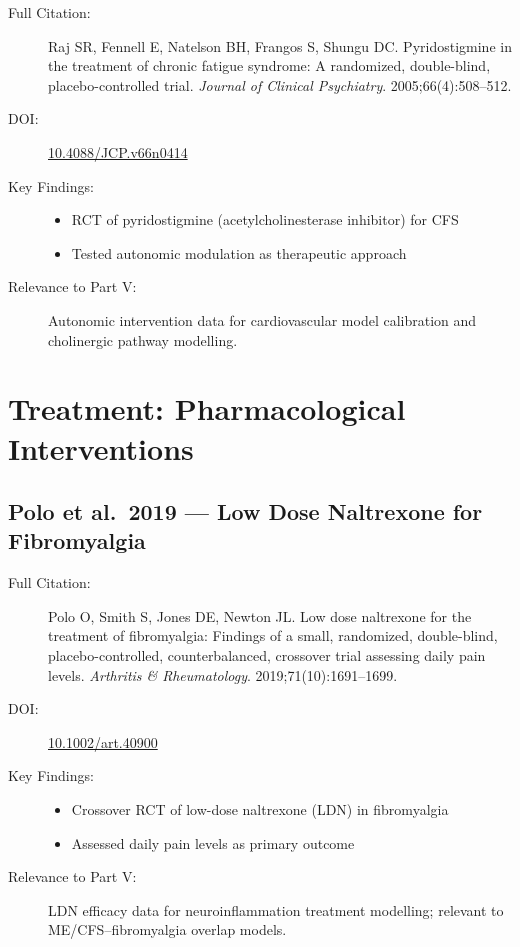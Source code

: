 \begin{description}
    \item[Full Citation:] Raj SR, Fennell E, Natelson BH, Frangos S, Shungu DC. Pyridostigmine in the treatment of chronic fatigue syndrome: A randomized, double-blind, placebo-controlled trial. \textit{Journal of Clinical Psychiatry}. 2005;66(4):508--512. \cite{Raj2005Pyridostigmine}
    \item[DOI:] \href{https://doi.org/10.4088/JCP.v66n0414}{10.4088/JCP.v66n0414}
    \item[Key Findings:]
    \begin{itemize}
        \item RCT of pyridostigmine (acetylcholinesterase inhibitor) for CFS
        \item Tested autonomic modulation as therapeutic approach
    \end{itemize}
    \item[Relevance to Part V:] Autonomic intervention data for cardiovascular model calibration and cholinergic pathway modelling.
\end{description}

\section{Treatment: Pharmacological Interventions}
\label{sec:bib-treatment-pharma-additions}

\subsection{Polo et al.\ 2019 --- Low Dose Naltrexone for Fibromyalgia}

\begin{description}
    \item[Full Citation:] Polo O, Smith S, Jones DE, Newton JL. Low dose naltrexone for the treatment of fibromyalgia: Findings of a small, randomized, double-blind, placebo-controlled, counterbalanced, crossover trial assessing daily pain levels. \textit{Arthritis \& Rheumatology}. 2019;71(10):1691--1699. \cite{Polo2019LDN}
    \item[DOI:] \href{https://doi.org/10.1002/art.40900}{10.1002/art.40900}
    \item[Key Findings:]
    \begin{itemize}
        \item Crossover RCT of low-dose naltrexone (LDN) in fibromyalgia
        \item Assessed daily pain levels as primary outcome
    \end{itemize}
    \item[Relevance to Part V:] LDN efficacy data for neuroinflammation treatment modelling; relevant to ME/CFS--fibromyalgia overlap models.
\end{description}


